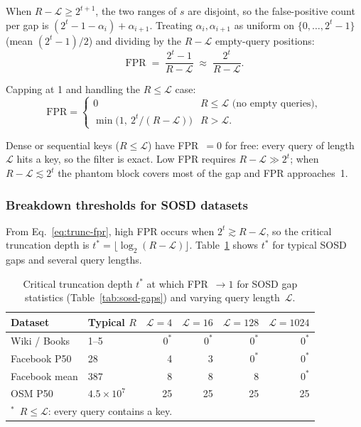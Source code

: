 When $R - \mathcal{L} \ge 2^{t+1}$, the two ranges of $s$ are disjoint, so the
false-positive count per gap is $(2^t - 1 - \alpha_i) + \alpha_{i+1}$.
Treating $\alpha_i, \alpha_{i+1}$ as uniform on $\{0, \ldots, 2^t - 1\}$ (mean $(2^t-1)/2$)
and dividing by the $R - \mathcal{L}$ empty-query positions:
\begin{equation}
    \mathrm{FPR}
    \;=\; \frac{2^t - 1}{R - \mathcal{L}}
    \;\approx\; \frac{2^t}{R - \mathcal{L}}.
    \label{eq:trunc-fpr}
\end{equation}

Capping at 1 and handling the $R \leq \mathcal{L}$ case:
\[
    \mathrm{FPR} =
    \begin{cases}
        0 & R \leq \mathcal{L} \text{ (no empty queries)}, \\
        \min\!\bigl(1,\ 2^t/(R - \mathcal{L})\bigr) & R > \mathcal{L}.
    \end{cases}
\]

Dense or sequential keys ($R \leq \mathcal{L}$) have FPR~$= 0$ for free: every query
of length $\mathcal{L}$ hits a key, so the filter is exact.
Low FPR requires $R - \mathcal{L} \gg 2^t$; when $R - \mathcal{L} \lesssim 2^t$
the phantom block covers most of the gap and FPR approaches~1.

\subsubsection*{Breakdown thresholds for SOSD datasets}

From Eq.~\eqref{eq:trunc-fpr}, high FPR occurs when $2^t \gtrsim R - \mathcal{L}$,
so the critical truncation depth is $t^* = \lfloor\log_2(R - \mathcal{L})\rfloor$.
Table~\ref{tab:trunc-breakdown} shows $t^*$ for typical SOSD gaps and several query lengths.

\begin{table}[H]
    \centering
    \begin{tabular}{@{}llrrrr@{}}
        \toprule
        Dataset       & Typical $R$     & $\mathcal{L}=4$ & $\mathcal{L}=16$ & $\mathcal{L}=128$ & $\mathcal{L}=1024$ \\
        \midrule
        Wiki / Books  & 1--5            & $0^*$           & $0^*$            & $0^*$             & $0^*$              \\
        Facebook P50  & 28              & 4               & 3                & $0^*$             & $0^*$              \\
        Facebook mean & 387             & 8               & 8                & 8                 & $0^*$              \\
        OSM P50       & $4.5\times10^7$ & 25              & 25               & 25                & 25                 \\
        \bottomrule
        \multicolumn{6}{l}{\footnotesize ${}^{*}$~$R \leq \mathcal{L}$: every query contains a key.}
    \end{tabular}
    \caption{Critical truncation depth $t^*$ at which FPR~$\to 1$ for SOSD gap statistics
        (Table~\ref{tab:sosd-gaps}) and varying query length~$\mathcal{L}$.}
    \label{tab:trunc-breakdown}
\end{table}

